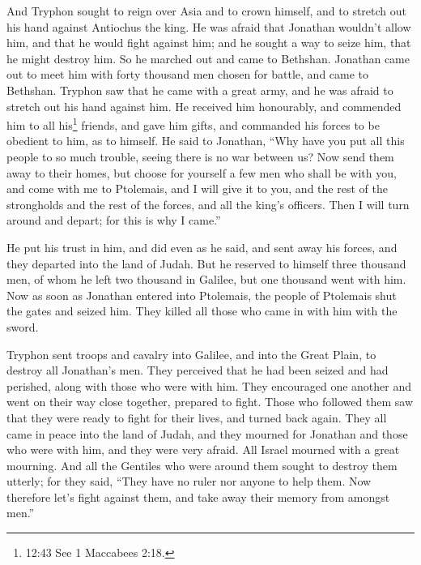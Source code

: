  And Tryphon sought to reign over Asia and to crown
himself, and to stretch out his hand against Antiochus the king.
 He was afraid that Jonathan wouldn't allow him, and that
he would fight against him; and he sought a way to seize him, that he
might destroy him. So he marched out and came to Bethshan. 
Jonathan came out to meet him with forty thousand men chosen for battle,
and came to Bethshan.  Tryphon saw that he came with a
great army, and he was afraid to stretch out his hand against him.
 He received him honourably, and commended him to all
his\footnote{12:43 See 1 Maccabees 2:18.} friends, and gave him gifts,
and commanded his forces to be obedient to him, as to himself.
 He said to Jonathan, ``Why have you put all this people to
so much trouble, seeing there is no war between us?  Now
send them away to their homes, but choose for yourself a few men who
shall be with you, and come with me to Ptolemais, and I will give it to
you, and the rest of the strongholds and the rest of the forces, and all
the king's officers. Then I will turn around and depart; for this is why
I came.''

 He put his trust in him, and did even as he said, and sent
away his forces, and they departed into the land of Judah. 
But he reserved to himself three thousand men, of whom he left two
thousand in Galilee, but one thousand went with him.  Now
as soon as Jonathan entered into Ptolemais, the people of Ptolemais shut
the gates and seized him. They killed all those who came in with him
with the sword.

 Tryphon sent troops and cavalry into Galilee, and into the
Great Plain, to destroy all Jonathan's men.  They perceived
that he had been seized and had perished, along with those who were with
him. They encouraged one another and went on their way close together,
prepared to fight.  Those who followed them saw that they
were ready to fight for their lives, and turned back again.
 They all came in peace into the land of Judah, and they
mourned for Jonathan and those who were with him, and they were very
afraid. All Israel mourned with a great mourning.  And all
the Gentiles who were around them sought to destroy them utterly; for
they said, ``They have no ruler nor anyone to help them. Now therefore
let's fight against them, and take away their memory from amongst men.''

